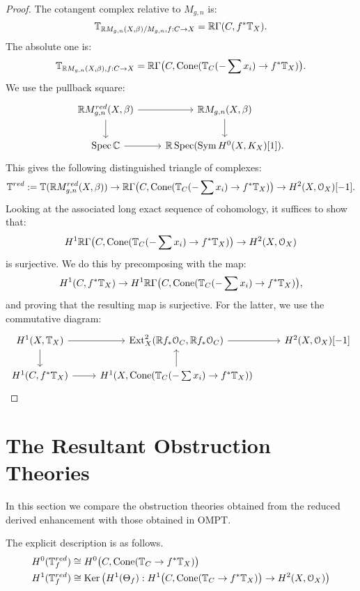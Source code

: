 \begin{proof}
The cotangent complex relative to $M_{g,n}$ is:
\[ \mathbb T_{\mathbb R M_{g,n}(X,\beta)/M_{g,n}, f:C \to X} = \mathbb R \Gamma(C,f^*\mathbb T_X) . \]
The absolute one is:
\[	\mathbb T_{\mathbb R M_{g,n}(X,\beta), f:C \to X} = \mathbb R \Gamma\big(C,\text{Cone}(\mathbb T_C(-\sum x_i) \to f^*\mathbb T_X)\big) .	\]
We use the pullback square:
\[
\begin{tikzcd}
\R M_{g,n}^{red}(X,\beta) \arrow{r}\arrow{d} & \R M_{g,n}(X,\beta)\arrow{d} \\
\Spec \C \arrow{r} & \R \Spec (\Sym H^0(X,K_X)[1]) .
\end{tikzcd}
\]
This gives the following distinguished triangle of complexes:
\[	\mathbb T^{red} := \mathbb T(\mathbb R M_{g,n}^{red}(X,\beta)) \to \mathbb R \Gamma \big(C,\text{Cone}(\mathbb T_C(-\sum x_i) \to f^*\mathbb T_X)\big)
\to H^2(X,\mathcal{O}_X)[-1] .	\]
Looking at the associated long exact sequence of cohomology, it suffices to show that:
\[	H^1 \mathbb R \Gamma \big(C,\text{Cone}(\mathbb T_C(-\sum x_i) \to f^*\mathbb T_X)\big) \to H^2(X,\mathcal{O}_X)	\]
is surjective. We do this by precomposing with the map:
\[	H^1(C,f^*\mathbb T_X) \to  H^1 \mathbb R \Gamma \big(C,\text{Cone}(\mathbb T_C(-\sum x_i) \to f^*\mathbb T_X)\big) ,	\]
and proving that the resulting map is surjective. For the latter, we use the commutative diagram:
\[
\begin{tikzcd}
H^1(X,\bbT_X)\arrow{d}\arrow{r} & \Ext^2_X(\R f_*\mathcal{O}_C, \R f_*\mathcal{O}_C) \arrow{r} & H^2(X,\mathcal{O}_X)[-1] \\
H^1(C,f^*\bbT_X) \arrow{r} & H^1(X,\text{Cone}(\bbT_C(-\sum x_i) \to f^*\bbT_X)) \arrow{u} & 
\end{tikzcd}
\]
\end{proof}

\section{The Resultant Obstruction Theories}

In this section we compare the obstruction theories obtained from the reduced derived enhancement with those obtained in OMPT.



The explicit description is as follows.
\begin{align*}
	H^0(\mathbb T^{red}_f) &\cong H^0\big(C,\text{Cone}(\mathbb T_C \to f^*\mathbb T_X)\big)	\\
	H^1(\mathbb T^{red}_f) &\cong \operatorname{Ker}\big(H^1(\Theta_f) : H^1\big(C,\text{Cone}(\mathbb T_C \to f^*\mathbb T_X)\big) \to H^2(X,\mathcal{O}_X)\big)
\end{align*}


